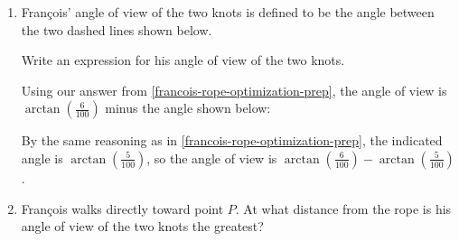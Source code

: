 \documentclass{article}
\begin{document}
\begin{enumerate}
\begin{enumerate}
  \item \label{francois-rope-optimization-angle}
    \begin{problem}[\vfill\newpage]
      Fran\c{c}ois' angle of view of the two knots is defined to be the
      angle between the two dashed lines shown below.
      \begin{center}
      \end{center}
      Write an expression for his angle of view of the two knots. 
    \end{problem}

    \begin{solution}
      Using our answer from \ref{francois-rope-optimization-prep}, the
      angle of view is $\arctan \left( \frac{6}{100} \right)$ minus the
      angle shown below:
      \begin{center}
      \end{center}
      By the same reasoning as in \ref{francois-rope-optimization-prep},
      the indicated angle is $\arctan \left( \frac{5}{100} \right)$, so
      the angle of view is $\boxed{\arctan \left( \frac{6}{100} \right) -
        \arctan \left( \frac{5}{100} \right)}$. 
    \end{solution}

  \item 

    \begin{problem}[\newpage]
      Fran\c{c}ois walks directly toward point $P$.  At what distance from
      the rope is his angle of view of the two knots the greatest?
    \end{problem}


\end{enumerate}
\end{enumerate}
\end{document}
